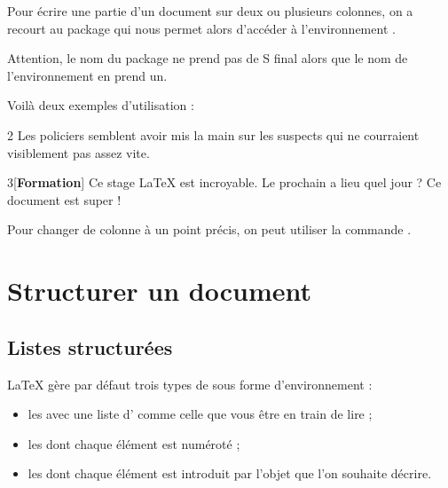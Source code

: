 Pour écrire une partie d'un document sur deux ou plusieurs colonnes, on a recourt au package  qui nous permet alors d'accéder à l'environnement .

\begin{info}
    Attention, le nom du package ne prend pas de S final alors que le nom de l'environnement en prend un.
\end{info}

Voilà deux exemples d'utilisation :\bigskip

{\NewFont
\begin{SideBySideExample}
    \setlength{\columnseprule}{0.4mm}
    \begin{multicols}{2}
        Les policiers semblent avoir mis la main
        sur les suspects qui ne courraient
        visiblement pas assez vite.
    \end{multicols}
\end{SideBySideExample}
\bigskip}

{\NewFont
\begin{SideBySideExample}
    \setlength{\columnseprule}{0.4pt}
    \begin{multicols}{3}[\textbf{Formation}]
        Ce stage \LaTeX{} est incroyable.
        Le prochain a lieu quel jour ? Ce
        document est super !
    \end{multicols}
\end{SideBySideExample}
\bigskip}

\begin{info}
    Pour changer de colonne à un point précis, on peut utiliser la commande .
\end{info}

\section{Structurer un document}
\subsection{Listes structurées}

\LaTeX{} gère par défaut trois types de  sous forme d'environnement :
\begin{itemize}[label=$-$]
    \item les  avec une liste d' comme celle que vous être en train de lire ;
    \item les  dont chaque élément est numéroté ;
    \item les  dont chaque élément est introduit par l'objet que l'on souhaite décrire.
\end{itemize}\medskip

